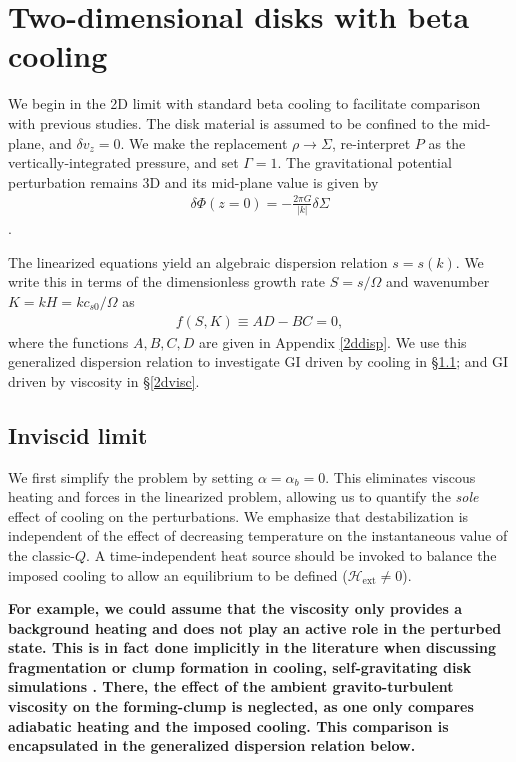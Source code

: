 \section{Two-dimensional disks with beta cooling}\label{result_2d}
We begin in the 2D limit with standard beta cooling  to facilitate comparison 
with previous studies. The disk
material is assumed to be confined to the mid-plane, and $\delta v_z=0$. 
We make the replacement  
$\rho \to \Sigma$, re-interpret $P$ as the vertically-integrated
pressure, and set $\Gamma=1$. %
The gravitational potential perturbation remains 3D and its mid-plane
value is given by    
\begin{align}
  \delta \Phi(z=0) = -\frac{2 \pi G}{|k|}\delta\Sigma
\end{align}
\citep{shu70}.
 
The linearized equations yield an algebraic dispersion relation $s =
s(k)$. We write this  
in terms of the dimensionless growth rate $S = s/\Omega$ and
wavenumber $K=kH = k c_{s0}/\Omega$ as
\begin{align}\label{thindisk}
  f(S,K)\equiv AD - BC = 0,   
\end{align}
where the functions $A,B,C,D$ are given in Appendix \ref{2ddisp}. %
We use this generalized dispersion relation  to investigate GI driven 
by cooling in \S\ref{2d_inviscid}; and GI driven by viscosity 
in \S\ref{2dvisc}. 




\subsection{Inviscid limit}\label{2d_inviscid}
We first simplify the problem by setting $\alpha = \alpha_b = 0$. This
eliminates viscous heating and forces in the linearized problem, 
allowing us to quantify the \emph{sole} effect of cooling on the 
perturbations. %
We emphasize that destabilization is independent of the effect of
decreasing temperature on the instantaneous value of the
classic-$Q$. A time-independent heat source should be invoked to
balance the imposed cooling to allow an equilibrium to be 
defined ($\mathcal{H}_\mathrm{ext}\neq 0$). 

{\bf
For example, we could assume that the viscosity only provides a
background heating and does not play an active role in the perturbed
state. This is in fact done implicitly in the literature when
discussing fragmentation or clump formation in cooling, 
self-gravitating disk simulations \citep{gammie01}. 
There, the effect of the ambient 
gravito-turbulent viscosity on the forming-clump is neglected, as 
one only compares adiabatic heating and the imposed cooling.  
This comparison is encapsulated in the generalized dispersion relation
below.}

